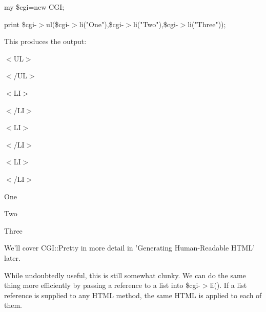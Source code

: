 \documentclass[a4paper,11pt]{book}
\begin{document}
\noindent my \$cgi=new CGI;

\noindent print \$cgi-$>$ul(\$cgi-$>$li("One"),\$cgi-$>$li("Two"),\$cgi-$>$li("Three"));

\noindent 

\noindent This produces the output:

\noindent 

\noindent $<$UL$>$

\noindent 

\noindent 

\noindent 

\noindent 

\noindent 

\noindent 

\noindent 

\noindent 

\noindent 

\noindent $<$/UL$>$

\noindent 

\noindent $<$LI$>$

\noindent 

\noindent $<$/LI$>$

\noindent $<$LI$>$

\noindent 

\noindent $<$/LI$>$

\noindent $<$LI$>$

\noindent 

\noindent $<$/LI$>$

\noindent 

\noindent 

\noindent One

\noindent 

\noindent 

\noindent Two

\noindent 

\noindent 

\noindent Three

\noindent 

\noindent 

\noindent 

\noindent We'll cover CGI::Pretty in more detail in 'Generating Human-Readable HTML' later.

\noindent While undoubtedly useful, this is still somewhat clunky. We can do the same thing more efficiently by passing a reference to a list into \$cgi-$>$li(). If a list reference is supplied to any HTML method, the same HTML is applied to each of them.
\end{document}
